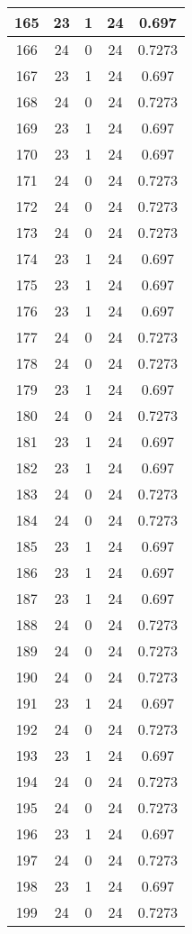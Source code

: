 \documentclass[letterpaper, 12pt]{article}
\begin{document}
\begin{longtable}{|c|c|c|c|c|}
\hline
165 & 23 & 1 & 24 & 0.697 \\
\hline
166 & 24 & 0 & 24 & 0.7273 \\
\hline
167 & 23 & 1 & 24 & 0.697 \\
\hline
168 & 24 & 0 & 24 & 0.7273 \\
\hline
169 & 23 & 1 & 24 & 0.697 \\
\hline
170 & 23 & 1 & 24 & 0.697 \\
\hline
171 & 24 & 0 & 24 & 0.7273 \\
\hline
172 & 24 & 0 & 24 & 0.7273 \\
\hline
173 & 24 & 0 & 24 & 0.7273 \\
\hline
174 & 23 & 1 & 24 & 0.697 \\
\hline
175 & 23 & 1 & 24 & 0.697 \\
\hline
176 & 23 & 1 & 24 & 0.697 \\
\hline
177 & 24 & 0 & 24 & 0.7273 \\
\hline
178 & 24 & 0 & 24 & 0.7273 \\
\hline
179 & 23 & 1 & 24 & 0.697 \\
\hline
180 & 24 & 0 & 24 & 0.7273 \\
\hline
181 & 23 & 1 & 24 & 0.697 \\
\hline
182 & 23 & 1 & 24 & 0.697 \\
\hline
183 & 24 & 0 & 24 & 0.7273 \\
\hline
184 & 24 & 0 & 24 & 0.7273 \\
\hline
185 & 23 & 1 & 24 & 0.697 \\
\hline
186 & 23 & 1 & 24 & 0.697 \\
\hline
187 & 23 & 1 & 24 & 0.697 \\
\hline
188 & 24 & 0 & 24 & 0.7273 \\
\hline
189 & 24 & 0 & 24 & 0.7273 \\
\hline
190 & 24 & 0 & 24 & 0.7273 \\
\hline
191 & 23 & 1 & 24 & 0.697 \\
\hline
192 & 24 & 0 & 24 & 0.7273 \\
\hline
193 & 23 & 1 & 24 & 0.697 \\
\hline
194 & 24 & 0 & 24 & 0.7273 \\
\hline
195 & 24 & 0 & 24 & 0.7273 \\
\hline
196 & 23 & 1 & 24 & 0.697 \\
\hline
197 & 24 & 0 & 24 & 0.7273 \\
\hline
198 & 23 & 1 & 24 & 0.697 \\
\hline
199 & 24 & 0 & 24 & 0.7273 \\
\hline
\end{longtable}
\end{document}
